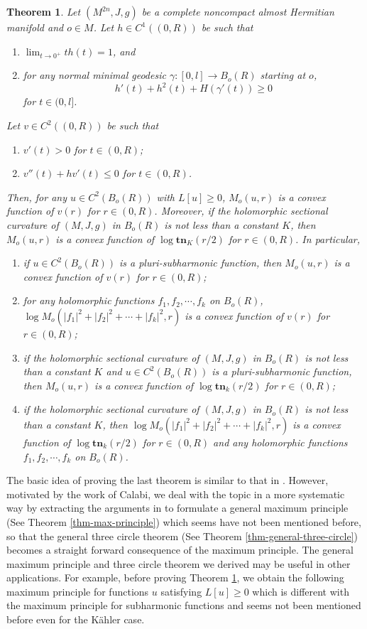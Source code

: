 \documentclass[12pt]{amsart}
\newtheorem{thm}{Theorem}[section]
\theoremstyle{definition}
\theoremstyle{remark}
\numberwithin{equation}{section}
\def\tn{{\mathbf{tn}}}
\def\D{\displaystyle}
\begin{document}
\begin{thm}\label{thm-three-circle-AH}
Let $(M^{2n},J,g)$ be a complete noncompact almost Hermitian manifold  and $o\in M$. Let $h\in C^1((0,R))$ be such that
\begin{enumerate}
\item $\D\lim_{t\to 0^+}th(t)=1$, and
\item for any normal minimal geodesic $\gamma:[0,l]\to B_o(R)$ starting at $o$,
\begin{equation}\label{eq-Riccati-h}
h'(t)+h^2(t)+H(\gamma'(t))\geq 0
\end{equation}
for $t\in (0,l]$.
\end{enumerate} Let $v\in C^2((0,R))$ be such that
\begin{enumerate}
\item $v'(t)>0$ for $t\in (0,R)$;
\item $v''(t)+hv'(t)\leq 0$ for $t\in (0,R)$.
\end{enumerate}
Then, for any $u\in C^2(B_o(R))$ with $L[u]\geq 0$, $M_o(u,r)$ is a convex function of $v(r)$ for $r\in (0,R)$. Moreover, if the holomorphic sectional curvature of $(M,J,g)$ in $B_o(R)$ is not less than a constant $K$, then $M_o(u,r)$ is a convex function of $\log\tn_K(r/2)$ for $r\in (0,R)$. In particular,
\begin{enumerate}
\item if $u\in C^2(B_o(R))$ is a pluri-subharmonic function, then $M_o(u,r)$ is a convex function of $v(r)$ for $r\in (0,R)$;
\item for any holomorphic functions $f_1,f_2,\cdots,f_k$ on $B_o(R)$, $\log M_o(|f_1|^2+|f_2|^2+\cdots+|f_k|^2,r)$ is a convex function of $v(r)$ for $r\in (0,R)$;
\item if the holomorphic sectional curvature of $(M,J,g)$ in $B_o(R)$ is not less than a constant $K$ and $u\in C^2(B_o(R))$ is a pluri-subharmonic function, then $M_o(u,r)$ is a convex function of $\log\tn_k(r/2)$ for $r\in (0,R)$;
\item if the holomorphic sectional curvature of $(M,J,g)$ in $B_o(R)$ is not less than a constant $K$, then $\log M_o(|f_1|^2+|f_2|^2+\cdots+|f_k|^2,r)$ is a convex function of $\log\tn_k(r/2)$ for $r\in (0,R)$ and any holomorphic functions $f_1,f_2,\cdots,f_k$ on $B_o(R)$.
\end{enumerate}
 \end{thm}
  The basic idea of proving the last theorem is similar to that in \cite{Liu}. However, motivated by the work \cite{Ca} of Calabi, we deal with the topic in a more systematic way by extracting the arguments in \cite{Liu} to formulate a general maximum principle (See Theorem \ref{thm-max-principle}) which seems have not been mentioned before, so that the general three circle theorem (See Theorem \ref{thm-general-three-circle}) becomes a straight forward consequence of the maximum principle. The general maximum principle and three circle theorem we derived may be useful in other applications. For example, before proving Theorem \ref{thm-three-circle-AH}, we obtain the following maximum principle for functions $u$ satisfying $L[u]\geq 0$ which is different with the maximum principle for subharmonic functions and seems not been mentioned before even for the K\"ahler case.
\end{document}
